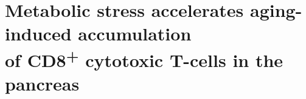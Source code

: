 \section[Metabolic stress accelerates aging-induced accumulation of CD8\textsuperscript{+} cytotoxic T-cells in the pancreas]{Metabolic stress accelerates aging-induced accumulation\\of CD8\textsuperscript{+} cytotoxic T-cells in the pancreas}
\label{sec:sc_tcells}

